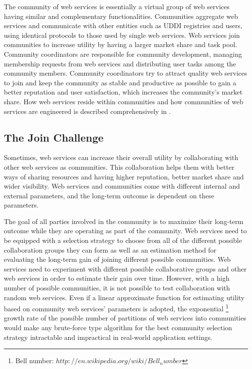 The community of web services is essentially a virtual group of web services having similar and complementary functionalities\cite{DBLP:journals/ijebr/MaamarSTBB09}. Communities aggregate web services and communicate with other entities such as UDDI registries and users, using identical protocols to those used by single web services. Web services join communities to increase utility by having a larger market share and task pool. Community coordinators are responsible for community development, managing membership requests from web services and distributing user tasks among the community members. Community coordinators try to attract quality web services to join and keep the community as stable and productive as possible to gain a better reputation and user satisfaction, which increases the community's market share. How web services reside within communities and how communities of web services are engineered is described comprehensively in \cite{DBLP:journals/ijebr/MaamarSTBB09}.

\subsection{The Join Challenge}\label{s:tjc}
Sometimes, web services can increase their overall utility by collaborating with other web services as communities. This collaboration helps them with better ways of sharing resources and having higher reputation, better market share and wider visibility. Web services and communities come with different internal and external parameters, and the long-term outcome is dependent on these parameters.

The goal of all parties involved in the community is to maximize their long-term outcome while they are operating as part of the community. Web services need to be equipped with a selection strategy to choose from all of the different possible collaboration groups they can form as well as an estimation method for evaluating the long-term gain of joining different possible communities. Web services need to experiment with different possible collaborative groups and other web services in order to estimate their gain over time. However, with a high number of possible communities, it is not possible to test collaboration with random web services. Even if a linear approximate function for estimating utility based on community web services' parameters is adopted, the exponential \footnote{Bell number: $http://en.wikipedia.org/wiki/Bell_number$} growth rate of the possible number of partitions of web services into communities would make any brute-force type algorithm for the best community selection strategy intractable and impractical in real-world application settings.

